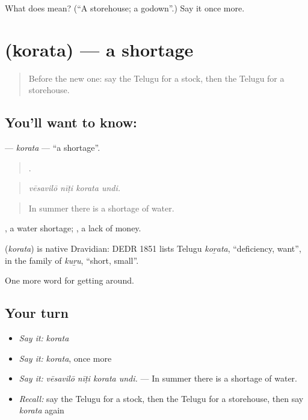 \begin{tcolorbox}[breakable,colback=teal!4,colframe=teal!35!black,title={Before you move on}]
What does  mean? (\textquotedblleft{}A storehouse; a godown\textquotedblright{}.) Say it once more.
\end{tcolorbox}
\section[\texorpdfstring{\te{కొరత} (korata)}{కొరత (korata)}]{ (korata) — a shortage}

\label{lesson:TE-C488-korata}



\begin{quote}
Before the new one: say the Telugu for a stock, then the Telugu for a storehouse.
\end{quote}

\subsection*{You'll want to know: }
\textbf{} — \emph{korata} — \textquotedblleft{}a shortage\textquotedblright{}.

\begin{quote}
   .
\end{quote}

\begin{quote}
\emph{vēsavilō nīṭi korata undi.}
\end{quote}

\begin{quote}
In summer there is a shortage of water.
\end{quote}

 , a water shortage;  , a lack of money.

\begin{cousinweb}
\textbf{} (\emph{korata}) is native Dravidian: DEDR 1851 lists Telugu \emph{koṟata}, \textquotedblleft{}deficiency, want\textquotedblright{}, in the family of \emph{kuṟu}, \textquotedblleft{}short, small\textquotedblright{}.
\end{cousinweb}

\begin{grammarlens}[title={What you've built}]
One more word for getting around.
\end{grammarlens}

\subsection*{Your turn}
\begin{itemize}
\raggedright
  \item \emph{Say it:} \emph{korata}
  \item \emph{Say it:} \emph{korata}, once more
  \item \emph{Say it:} \emph{vēsavilō nīṭi korata undi.} — In summer there is a shortage of water.
  \item \emph{Recall:} say the Telugu for a stock, then the Telugu for a storehouse, then say \emph{korata} again
\end{itemize}

